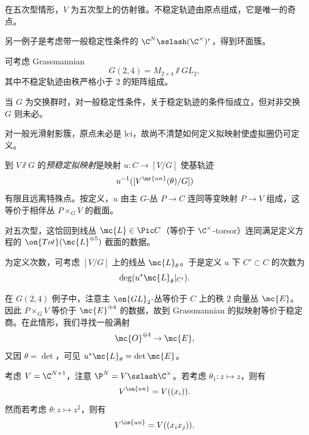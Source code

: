 \begin{exm}
    在五次型情形，\(V\) 为五次型上的仿射锥。不稳定轨迹由原点组成，它是唯一的奇点。
\end{exm}

\begin{exm}
    另一例子是考虑带一般稳定性条件的 \(\C^N \sslash (\C^{\times})^r\)，得到环面簇。
\end{exm}

\begin{exm}
    可考虑 Grassmannian
    \[ G(2,4) = M_{2\times 4} \sslash GL_2, \]
    其中不稳定轨迹由秩严格小于 \(2\) 的矩阵组成。
\end{exm}

\begin{rmk}
    当 \(G\) 为交换群时，对一般稳定性条件，关于稳定轨迹的条件恒成立，但对非交换 \(G\) 则未必。
\end{rmk}

\begin{rmk}
    对一般光滑射影簇，原点未必是 lci，故尚不清楚如何定义拟映射使虚拟圈仍可定义。
\end{rmk}

\begin{defn}
    到 \(V \sslash G\) 的\textit{预稳定拟映射}是映射 \(u \colon C \to [V/G]\) 使基轨迹
    \[ u^{-1}([V^{\mr{un}}(\theta) / G]) \]
    有限且远离特殊点。按定义，\(u\) 由主 \(G\)-丛 \(P \to C\) 连同等变映射 \(P \to V\) 组成，这等价于相伴丛 \(P \times_G V\) 的截面。
\end{defn}

\begin{exm}
    对五次型，这恰回到线丛 \(\mc{L} \in \Pic C\)（等价于 \(\C^{\times}\)-torsor）连同满足定义方程的 \(\on{Tot}(\mc{L}^{\oplus 5})\) 截面的数据。
\end{exm}

为定义次数，可考虑 \([V/G]\) 上的线丛 \(\mc{L}_{\theta}\)。于是定义 \(u\) 下 \(C' \subset C\) 的次数为
\[ \deg (u^* \mc{L}_{\theta}|_{C'}). \]

\begin{exm}
    在 \(G(2,4)\) 例子中，注意主 \(\on{GL}_2\)-丛等价于 \(C\) 上的秩 \(2\) 向量丛 \(\mc{E}\)。因此 \(P \times_G V\) 等价于 \(\mc{E}^{\oplus 4}\) 的数据，故到 Grassmannian 的拟映射等价于稳定商。在此情形，我们寻找一般满射
    \[ \mc{O}^{\oplus 4} \to \mc{E}, \]
    又因 \(\theta = \det\)，可见 \(u^* \mc{L}_{\theta} = \det \mc{E}\)。
\end{exm}

\begin{exm}
    考虑 \(V = \C^{N+1}\)，注意 \(\P^N = V \sslash \C^{\times}\)。若考虑 \(\theta_1 \colon z \mapsto z\)，则有
    \[ V^{\on{un}} = V((x_i)). \]
    然而若考虑 \(\theta \colon z \mapsto z^2\)，则有
    \[ V^{\on{un}} = V((x_i x_j)). \]
\end{exm}

